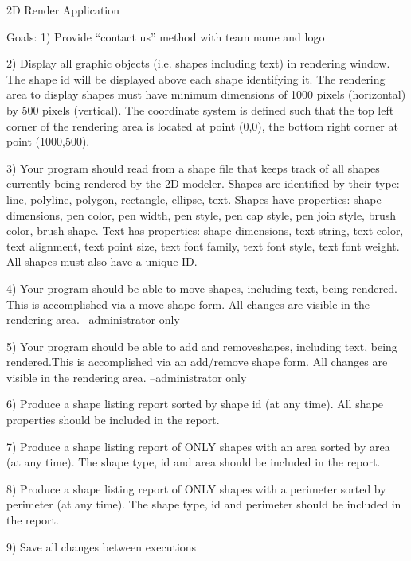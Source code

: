2D Render Application

Goals\+: 1) Provide “contact us” method with team name and logo

2) Display all graphic objects (i.\+e. shapes including text) in rendering window. The shape id will be displayed above each shape identifying it. The rendering area to display shapes must have minimum dimensions of 1000 pixels (horizontal) by 500 pixels (vertical). The coordinate system is defined such that the top left corner of the rendering area is located at point (0,0), the bottom right corner at point (1000,500).

3) Your program should read from a shape file that keeps track of all shapes currently being rendered by the 2D modeler. Shapes are identified by their type\+: line, polyline, polygon, rectangle, ellipse, text. Shapes have properties\+: shape dimensions, pen color, pen width, pen style, pen cap style, pen join style, brush color, brush shape. \mbox{\hyperlink{class_text}{Text}} has properties\+: shape dimensions, text string, text color, text alignment, text point size, text font family, text font style, text font weight. All shapes must also have a unique ID.

4) Your program should be able to move shapes, including text, being rendered. This is accomplished via a move shape form. All changes are visible in the rendering area. –administrator only

5) Your program should be able to add and removeshapes, including text, being rendered.\+This is accomplished via an add/remove shape form. All changes are visible in the rendering area. –administrator only

6) Produce a shape listing report sorted by shape id (at any time). All shape properties should be included in the report.

7) Produce a shape listing report of O\+N\+LY shapes with an area sorted by area (at any time). The shape type, id and area should be included in the report.

8) Produce a shape listing report of O\+N\+LY shapes with a perimeter sorted by perimeter (at any time). The shape type, id and perimeter should be included in the report.

9) Save all changes between executions 
